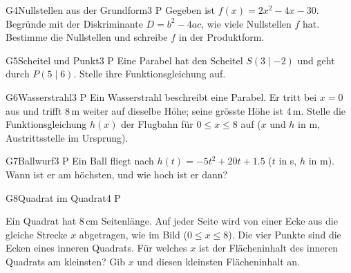 \documentclass[11pt]{article}
\begin{document}
\begin{lpaufgabe}{G4}{Nullstellen aus der Grundform}{3 P}
Gegeben ist $f(x) = 2x^2 - 4x - 30$. Begründe mit der Diskriminante $D = b^2 - 4ac$, wie viele Nullstellen $f$ hat.
Bestimme die Nullstellen und schreibe $f$ in der Produktform.
\end{lpaufgabe}


\begin{lpaufgabe}{G5}{Scheitel und Punkt}{3 P}
Eine Parabel hat den Scheitel $S(3 \mid -2)$ und geht durch $P(5 \mid 6)$. Stelle ihre Funktionsgleichung auf.
\end{lpaufgabe}

\begin{lpaufgabe}{G6}{Wasserstrahl}{3 P}
Ein Wasserstrahl beschreibt eine Parabel. Er tritt bei $x = 0$ aus und trifft 8\,m weiter auf dieselbe Höhe; seine grösste Höhe ist 4\,m.
Stelle die Funktionsgleichung $h(x)$ der Flugbahn für $0 \le x \le 8$ auf ($x$ und $h$ in m, Austrittsstelle im Ursprung).
\end{lpaufgabe}


\begin{lpaufgabe}{G7}{Ballwurf}{3 P}
Ein Ball fliegt nach $h(t) = -5t^2 + 20t + 1.5$ ($t$ in s, $h$ in m). Wann ist er am höchsten, und wie hoch ist er dann?
\end{lpaufgabe}

\begin{lpaufgabe}{G8}{Quadrat im Quadrat}{4 P}
\begin{minipage}[t]{0.6\linewidth}
Ein Quadrat hat 8\,cm Seitenlänge. Auf jeder Seite wird von einer Ecke aus die gleiche Strecke $x$ abgetragen, wie im Bild ($0 \le x \le 8$).
Die vier Punkte sind die Ecken eines inneren Quadrats.
Für welches $x$ ist der Flächeninhalt des inneren Quadrats am kleinsten? Gib $x$ und diesen kleinsten Flächeninhalt an.
\end{minipage}\hfill
\begin{minipage}[t]{0.34\linewidth}\vspace{0pt}\centering
{}
\end{minipage}
\end{lpaufgabe}
\end{document}
